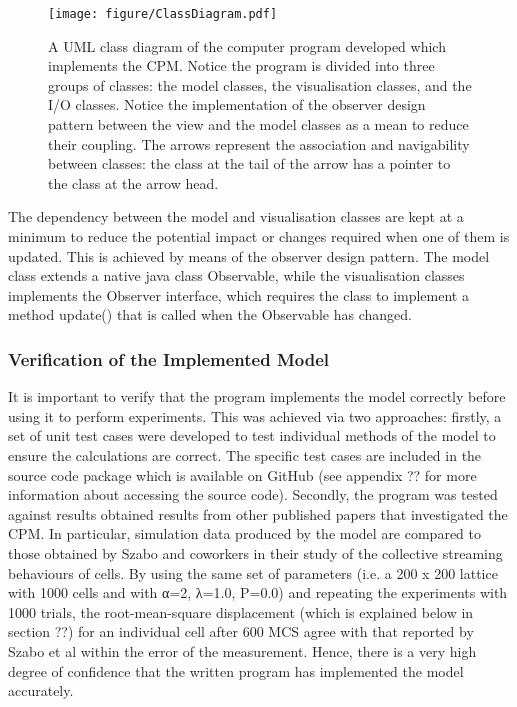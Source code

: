 \documentclass[a4paper,12pt]{article}
\begin{document}
\begin{figure}[h]
\texttt{[image: figure/ClassDiagram.pdf]}
\caption{A UML class diagram of the computer program developed which implements the CPM. Notice the program is divided into three groups of classes: the model classes, the visualisation classes, and the I/O classes. Notice the implementation of the observer design pattern between the view and the model classes as a mean to reduce their coupling. The arrows represent the association and navigability between classes: the class at the tail of the arrow has a pointer to the class at the arrow head.}
\label{fig:ClassDiagram}
\end{figure}

The dependency between the model and visualisation classes are kept at a minimum to reduce the potential impact or changes required when one of them is updated. This is achieved by means of the observer design pattern. The model class extends a native java class Observable, while the visualisation classes implements the Observer interface, which requires the class to implement a method update() that is called when the Observable has changed. 

\subsubsection{Verification of the Implemented Model}
It is important to verify that the program implements the model correctly before using it to perform experiments. This was achieved via two approaches: firstly, a set of unit test cases were developed to test individual methods of the model to ensure the calculations are correct. The specific test cases are included in the source code package which is available on GitHub (see appendix ?? for more information about accessing the source code). Secondly, the program was tested against results obtained results from other published papers that investigated the CPM. In particular, simulation data produced by the model are compared to those obtained by Szabo and coworkers in their study of the collective streaming behaviours of cells. By using the same set of parameters (i.e. a 200 x 200 lattice with 1000 cells and with α=2, λ=1.0, P=0.0) and repeating the experiments with 1000 trials, the root-mean-square displacement (which is explained below in section ??) for an individual cell after 600 MCS agree with that reported by Szabo et al within the error of the measurement. Hence, there is a very high degree of confidence that the written program has implemented the model accurately.
\end{document}
